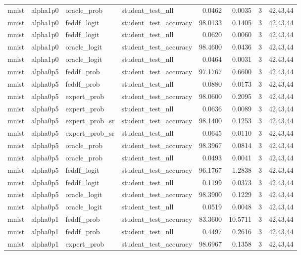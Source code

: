 \begin{tabular}{llllrrrl}
mnist & alpha1p0 & oracle\_prob & student\_test\_nll & 0.0462 & 0.0035 & 3 & 42,43,44 \\
mnist & alpha1p0 & feddf\_logit & student\_test\_accuracy & 98.0133 & 0.1405 & 3 & 42,43,44 \\
mnist & alpha1p0 & feddf\_logit & student\_test\_nll & 0.0620 & 0.0060 & 3 & 42,43,44 \\
mnist & alpha1p0 & oracle\_logit & student\_test\_accuracy & 98.4600 & 0.0436 & 3 & 42,43,44 \\
mnist & alpha1p0 & oracle\_logit & student\_test\_nll & 0.0464 & 0.0031 & 3 & 42,43,44 \\
mnist & alpha0p5 & feddf\_prob & student\_test\_accuracy & 97.1767 & 0.6600 & 3 & 42,43,44 \\
mnist & alpha0p5 & feddf\_prob & student\_test\_nll & 0.0880 & 0.0173 & 3 & 42,43,44 \\
mnist & alpha0p5 & expert\_prob & student\_test\_accuracy & 98.0600 & 0.2095 & 3 & 42,43,44 \\
mnist & alpha0p5 & expert\_prob & student\_test\_nll & 0.0636 & 0.0089 & 3 & 42,43,44 \\
mnist & alpha0p5 & expert\_prob\_sr & student\_test\_accuracy & 98.1400 & 0.1253 & 3 & 42,43,44 \\
mnist & alpha0p5 & expert\_prob\_sr & student\_test\_nll & 0.0645 & 0.0110 & 3 & 42,43,44 \\
mnist & alpha0p5 & oracle\_prob & student\_test\_accuracy & 98.3967 & 0.0814 & 3 & 42,43,44 \\
mnist & alpha0p5 & oracle\_prob & student\_test\_nll & 0.0493 & 0.0041 & 3 & 42,43,44 \\
mnist & alpha0p5 & feddf\_logit & student\_test\_accuracy & 96.1767 & 1.2838 & 3 & 42,43,44 \\
mnist & alpha0p5 & feddf\_logit & student\_test\_nll & 0.1199 & 0.0373 & 3 & 42,43,44 \\
mnist & alpha0p5 & oracle\_logit & student\_test\_accuracy & 98.3900 & 0.1229 & 3 & 42,43,44 \\
mnist & alpha0p5 & oracle\_logit & student\_test\_nll & 0.0519 & 0.0048 & 3 & 42,43,44 \\
mnist & alpha0p1 & feddf\_prob & student\_test\_accuracy & 83.3600 & 10.5711 & 3 & 42,43,44 \\
mnist & alpha0p1 & feddf\_prob & student\_test\_nll & 0.4497 & 0.2616 & 3 & 42,43,44 \\
mnist & alpha0p1 & expert\_prob & student\_test\_accuracy & 98.6967 & 0.1358 & 3 & 42,43,44 \\

\end{tabular}
